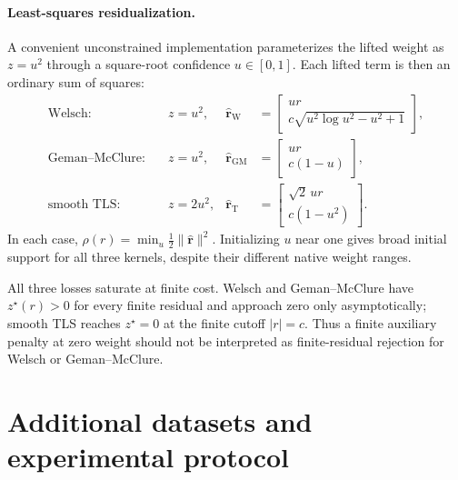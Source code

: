 \documentclass[runningheads]{llncs}
\begin{document}
\paragraph{Least-squares residualization.}
A convenient unconstrained implementation parameterizes the lifted weight as
$z=u^2$ through a square-root confidence $u\in[0,1]$. Each lifted term is then
an ordinary sum of squares:
\begin{align}
	\text{Welsch:}\quad         &
	z=u^2,                      &
	\widehat{\mathbf r}_{\mathrm W}
	                            & =
	\begin{bmatrix}
		ur \\
		c\sqrt{u^2\log u^2-u^2+1}
	\end{bmatrix},
	\label{eq:supp-welsch-residual} \\
	\text{Geman--McClure:}\quad &
	z=u^2,                      &
	\widehat{\mathbf r}_{\mathrm{GM}}
	                            & =
	\begin{bmatrix}
		ur \\
		c(1-u)
	\end{bmatrix},
	\label{eq:supp-gm-residual}     \\
	\text{smooth TLS:}\quad     &
	z=2u^2,                     &
	\widehat{\mathbf r}_{\mathrm T}
	                            & =
	\begin{bmatrix}
		\sqrt2\,ur \\
		c(1-u^2)
	\end{bmatrix}.
	\label{eq:supp-tls-residual}
\end{align}
In each case,
$\rho(r)=\min_u\tfrac12\lVert\widehat{\mathbf r}\rVert^2$.
Initializing $u$ near one gives broad initial support for all three kernels,
despite their different native weight ranges.

All three losses saturate at finite cost. Welsch and Geman--McClure have
$z^\star(r)>0$ for every finite residual and approach zero only
asymptotically; smooth TLS reaches $z^\star=0$ at the finite cutoff
$|r|=c$. Thus a finite auxiliary penalty at zero weight should not be
interpreted as finite-residual rejection for Welsch or Geman--McClure.

\section{Additional datasets and experimental protocol}
\label{sec:supp-protocol}
\end{document}
